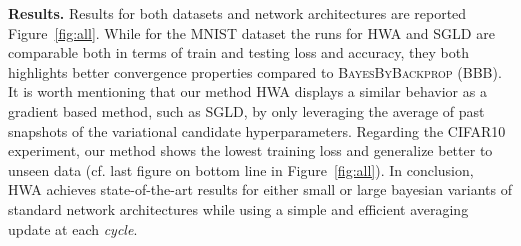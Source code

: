 \documentclass[tablecaption=bottom,wcp]{jmlr}
\begin{document}
\vspace{0.08in}
\noindent \textbf{Results.} \hspace{0.1in} 
Results for both datasets and network architectures are reported Figure~\ref{fig:all}.
While for the MNIST dataset the runs for \textsc{HWA} and \textsc{SGLD} are comparable both in terms of train and testing loss and accuracy, they both highlights better convergence properties compared to \textsc{BayesByBackprop} (BBB).
It is worth mentioning that our method \textsc{HWA} displays a similar behavior as a gradient based method, such as \textsc{SGLD}, by only leveraging the average of past snapshots of the variational candidate hyperparameters. 
Regarding the CIFAR10 experiment, our method shows the lowest training loss and generalize better to unseen data (cf. last figure on bottom line in Figure~\ref{fig:all}).
In conclusion, \textsc{HWA} achieves state-of-the-art results for either small or large bayesian variants of standard network architectures while using a simple and efficient averaging update at each \textit{cycle}.
\end{document}
